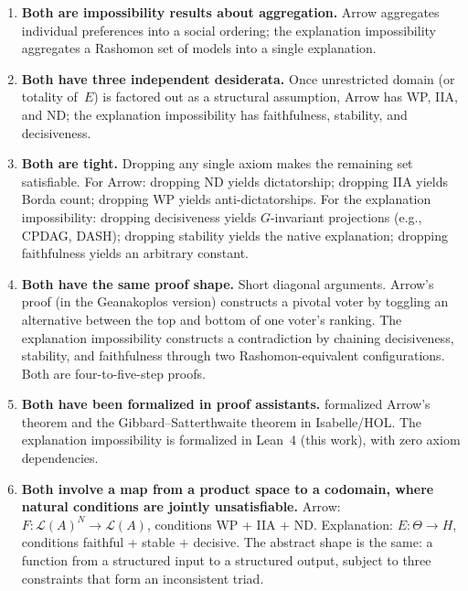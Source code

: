 \begin{enumerate}
  \item \textbf{Both are impossibility results about aggregation.}\;
    Arrow aggregates individual preferences into a social ordering;
    the explanation impossibility aggregates a Rashomon set of models
    into a single explanation.

  \item \textbf{Both have three independent desiderata.}\; Once
    unrestricted domain (or totality of~$E$) is factored out as a
    structural assumption, Arrow has WP, IIA, and ND; the explanation
    impossibility has faithfulness, stability, and decisiveness.

  \item \textbf{Both are tight.}\; Dropping any single axiom makes
    the remaining set satisfiable. For Arrow: dropping ND yields
    dictatorship; dropping IIA yields Borda count; dropping WP yields
    anti-dictatorships. For the explanation impossibility: dropping
    decisiveness yields $G$-invariant projections (e.g., CPDAG, DASH);
    dropping stability yields the native explanation; dropping
    faithfulness yields an arbitrary constant.

  \item \textbf{Both have the same proof shape.}\; Short diagonal
    arguments. Arrow's proof (in the Geanakoplos version) constructs
    a pivotal voter by toggling an alternative between the top and
    bottom of one voter's ranking. The explanation impossibility
    constructs a contradiction by chaining decisiveness, stability,
    and faithfulness through two Rashomon-equivalent configurations.
    Both are four-to-five-step proofs.

  \item \textbf{Both have been formalized in proof assistants.}\;
    \citet{nipkow2009social} formalized Arrow's theorem and
    the Gibbard--Satterthwaite theorem \citep{gibbard1973manipulation,
    satterthwaite1975strategy} in Isabelle/HOL.
    The explanation impossibility is formalized in Lean~4 (this work),
    with zero axiom dependencies.

  \item \textbf{Both involve a map from a product space to a
    codomain, where natural conditions are jointly unsatisfiable.}\;
    Arrow: $F : \mathcal{L}(A)^N \to \mathcal{L}(A)$, conditions
    WP + IIA + ND. Explanation: $E : \Theta \to H$, conditions
    faithful + stable + decisive. The abstract shape is the same:
    a function from a structured input to a structured output,
    subject to three constraints that form an inconsistent triad.
\end{enumerate}

